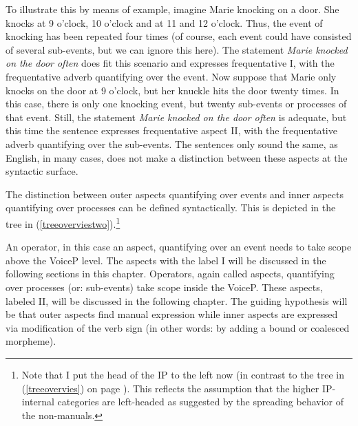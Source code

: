 To illustrate this by means of example, imagine Marie knocking on a door. She knocks at 9 o'clock, 10 o'clock and at 11 and 12 o'clock. Thus, the event of knocking has been repeated four times (of course, each event could have consisted of several sub-events, but we can ignore this here). The statement \textit{Marie knocked on the door often} does fit this scenario and expresses frequentative I, with the frequentative adverb quantifying over the event. Now suppose that Marie only knocks on the door at 9 o'clock, but her knuckle hits the door twenty times. In this case, there is only one knocking event, but twenty sub-events or processes of that event. Still, the statement \textit{Marie knocked on the door often} is adequate, but this time the sentence expresses frequentative aspect II, with the frequentative adverb quantifying over the sub-events. The sentences only sound the same, as English, in many cases, does not make a distinction between these aspects at the syntactic surface. 

The distinction between outer aspects quantifying over events and inner aspects quantifying over processes can be defined syntactically. This is depicted in the tree in (\ref{treeoverviestwo}).\footnote{ Note that I put the head of the IP to the left now (in contrast to the tree in (\ref{treeovervies}) on page \pageref{treeovervies}). This reflects the assumption that the higher IP-internal categories are left-headed as suggested by the spreading behavior of the non-manuals.} 

An operator, in this case an aspect, quantifying over an event needs to take scope above the VoiceP level. The aspects with the label I will be discussed in the following sections in this chapter. Operators, again called aspects, quantifying over processes (or: sub-events) take scope inside the VoiceP. These aspects, labeled II, will be discussed in the following chapter. The guiding hypothesis will be that outer aspects find manual expression while inner aspects are expressed via modification of the verb sign (in other words: by adding a bound or coalesced morpheme). 

